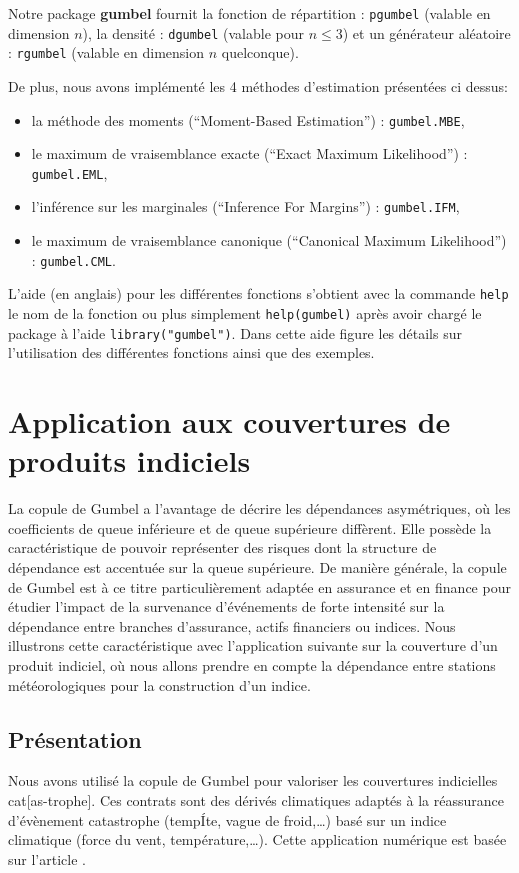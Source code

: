 \documentclass[11pt]{article}
\newcommand{\pkg}{\textbf}
\newcommand{\code}{\texttt}
\begin{document}
Notre package \pkg{gumbel}  fournit la fonction de r\'epartition : \code{pgumbel} (valable en dimension $n$),
la densit\'e : \code{dgumbel} (valable pour $n\leq 3$) et un g\'en\'erateur al\'eatoire : \code{rgumbel} 
(valable en dimension $n$ quelconque).

De plus, nous avons impl\'ement\'e les 4 m\'ethodes d'estimation pr\'esent\'ees ci dessus:
\begin{itemize}
\item la m\'ethode des moments (``Moment-Based Estimation'') : \code{gumbel.MBE},
\item le maximum de vraisemblance exacte (``Exact Maximum Likelihood'') : \code{gumbel.EML},
\item l'inf\'erence sur les marginales (``Inference For Margins'') : \code{gumbel.IFM},
\item le maximum de vraisemblance canonique (``Canonical Maximum Likelihood'') : \code{gumbel.CML}.
\end{itemize}
L'aide (en anglais) pour les diff\'erentes fonctions s'obtient avec la commande \code{help} le nom de la fonction
ou plus simplement \code{help(gumbel)} apr\`es avoir charg\'e le package \`a l'aide \code{library("gumbel")}.
Dans cette aide figure les d\'etails sur l'utilisation des diff\'erentes fonctions ainsi que des exemples.

\section{Application aux couvertures de produits indiciels}
La copule de Gumbel a l'avantage de d\'ecrire les d\'ependances asym\'etriques, 
o\`u les coefficients de queue inf\'erieure et de queue sup\'erieure diff\`erent.
Elle poss\`ede la caract\'eristique de pouvoir repr\'esenter des risques dont la structure 
de d\'ependance est accentu\'ee sur la queue sup\'erieure. 
De mani\`ere g\'en\'erale, la copule de Gumbel est \`a ce titre particuli\`erement adapt\'ee 
en assurance et en finance pour \'etudier l'impact de la survenance d'\'ev\'enements de forte 
intensit\'e sur la d\'ependance entre branches d'assurance, actifs financiers ou indices.
Nous illustrons cette caract\'eristique avec l'application suivante sur la couverture d'un produit indiciel,
o\`u nous allons prendre en compte la d\'ependance entre stations m\'et\'eorologiques pour
la construction d'un indice.



\subsection{Pr\'esentation}
Nous avons utilis\'e la copule de Gumbel pour valoriser les couvertures indicielles cat[as-trophe]. Ces contrats sont des d\'eriv\'es
climatiques adapt\'es \`a la r\'eassurance d'\'ev\`enement catastrophe (tempÍte, vague de froid,\dots) bas\'e sur un indice climatique
(force du vent, temp\'erature,\dots). Cette application num\'erique est bas\'ee sur l'article \cite{benfield}.
\end{document}
